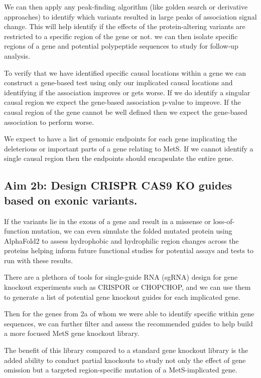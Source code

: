 \documentclass[11pt]{article}
\begin{document}
We can then apply any peak-finding algorithm (like golden search or derivative approaches) to identify which variants resulted in large peaks of association signal change. This will help identify if the effects of the protein-altering variants are restricted to a specific region of the gene or not. we can then isolate specific regions of a gene and potential polypeptide sequences to study for follow-up analysis.

To verify that we have identified specific causal locations within a gene we can construct a gene-based test using only our implicated causal locations and identifying if the association improves or gets worse. If we do identify a singular causal region we expect the gene-based association p-value to improve. If the causal region of the gene cannot be well defined then we expect the gene-based association to perform worse.

We expect to have a list of genomic endpoints for each gene implicating the deleterious or important parts of a gene relating to MetS. If we cannot identify a single causal region then the endpoints should encapsulate the entire gene.

\subsection*{Aim 2b: Design CRISPR CAS9 KO guides based on exonic variants.} 

If the variants lie in the exons of a gene and result in a missense or loss-of-function mutation, we can even simulate the folded mutated protein using AlphaFold2 to assess hydrophobic and hydrophilic region changes across the proteins helping inform future functional studies for potential assays and tests to run with these results.

There are a plethora of tools for single-guide RNA (sgRNA) design for gene knockout experiments such as CRISPOR or CHOPCHOP, and we can use them to generate a list of potential gene knockout guides for each implicated gene.

Then for the genes from 2a of whom we were able to identify specific within gene sequences, we can further filter and assess the recommended guides to help build a more focused MetS gene knockout library.

The benefit of this library compared to a standard gene knockout library is the added ability to conduct partial knockouts to study not only the effect of gene omission but a targeted region-specific mutation of a MetS-implicated gene.
\end{document}
